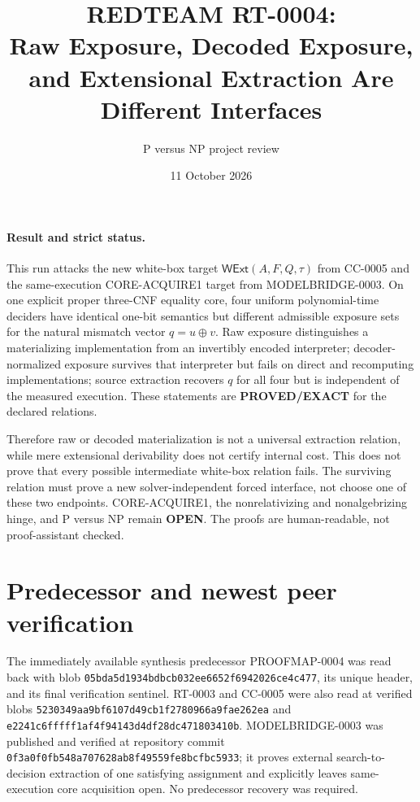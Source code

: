 \documentclass[11pt]{article}
\title{REDTEAM RT-0004:\\Raw Exposure, Decoded Exposure, and Extensional Extraction Are Different Interfaces}
\author{P versus NP project review}
\date{11 October 2026}
\begin{document}
\maketitle

\paragraph{Result and strict status.}
This run attacks the new white-box target
$\mathsf{WExt}(A,F,Q,\tau)$ from CC-0005 and the same-execution
\textsf{CORE-ACQUIRE1} target from MODELBRIDGE-0003.  On one explicit proper
three-CNF equality core, four uniform polynomial-time deciders have identical
one-bit semantics but different admissible exposure sets for the natural
mismatch vector $q=u\oplus v$.  Raw exposure distinguishes a materializing
implementation from an invertibly encoded interpreter; decoder-normalized
exposure survives that interpreter but fails on direct and recomputing
implementations; source extraction recovers $q$ for all four but is independent
of the measured execution.  These statements are \textbf{PROVED/EXACT} for
the declared relations.

Therefore raw or decoded materialization is not a universal extraction
relation, while mere extensional derivability does not certify internal cost.
This does not prove that every possible intermediate white-box relation fails.
The surviving relation must prove a new solver-independent forced interface,
not choose one of these two endpoints.  \textsf{CORE-ACQUIRE1}, the
nonrelativizing and nonalgebrizing hinge, and P versus NP remain
\textbf{OPEN}.  The proofs are human-readable, not proof-assistant checked.

\section{Predecessor and newest peer verification}
The immediately available synthesis predecessor PROOFMAP-0004 was read back
with blob \texttt{05bda5d1934bdbcb032ee6652f6942026ce4c477}, its unique
header, and its final verification sentinel.  RT-0003 and CC-0005 were also
read at verified blobs \texttt{5230349aa9bf6107d49cb1f2780966a9fae262ea}
and \texttt{e2241c6fffff1af4f94143d4df28dc471803410b}.
MODELBRIDGE-0003 was published and verified at repository commit
\texttt{0f3a0f0fb548a707628ab8f49559fe8bcfbc5933}; it proves external
search-to-decision extraction of one satisfying assignment and explicitly
leaves same-execution core acquisition open.  No predecessor recovery was
required.
\end{document}
